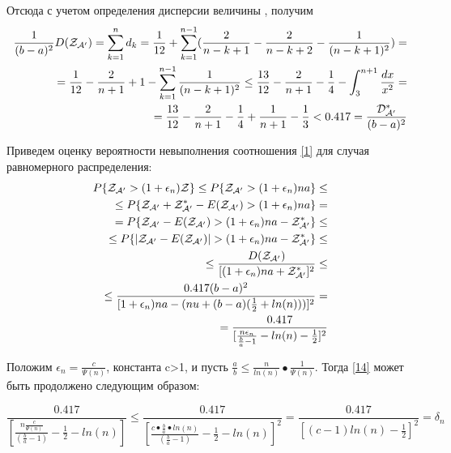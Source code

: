 \documentclass[a4paper, 14pt]{extarticle}
\numberwithin{equation}{section}
\begin{document}
Отсюда с учетом определения дисперсии величины \randomvalue , получим
\begin{equation}
\begin{aligned}
\frac{1}{(b-a)^2} \text{$D(\text{$\mathcal{Z_{A'}}$})$} = \sum_{k=1}^n d_k = \frac{1}{12} + \sum_{k=1}^{n-1} (\frac{2}{n-k+1} - \frac{2}{n-k+2} - \frac{1}{(n-k+1)^2}) = \\
= \frac{1}{12} - \frac{2}{n+1} +1 - \sum_{k=1}^{n-1} \frac{1}{(n-k+1)^2} \leq \frac{13}{12} - \frac{2}{n+1} - \frac{1}{4} - \int_3^{n+1} \frac{dx}{x^2} = \\
= \frac{13}{12} - \frac{2}{n+1} - \frac{1}{4} + \frac{1}{n+1} - \frac{1}{3} < 0.417 = \frac{\text{$\mathcal{D^*_{A'}}$}}{(b-a)^2} 
\end{aligned}
\end{equation}

Приведем оценку вероятности невыполнения соотношения \eqref{1} для случая равномерного распределения:
\begin{equation}\label{14}
\begin{aligned}
P\{ \text{$\mathcal{Z_{A'}}$} > (1+\epsilon_n) \mathcal{Z} \} \leq P\{ \text{$\mathcal{Z_{A'}}$} > (1+\epsilon_n)na \} \leq \\
\leq P\{ \text{$\mathcal{Z_{A'}}$} + \text{$\mathcal{Z^*_{A'}}$} - \text{$E(\text{$\mathcal{Z_{A'}}$})$} > (1+\epsilon_n)na \} = \\
= P \{ \text{$\mathcal{Z_{A'}}$} - \text{$E(\text{$\mathcal{Z_{A'}}$})$} > (1+\epsilon_n)na - \text{$\mathcal{Z^*_{A'}}$} \} \leq \\
\leq P \{ |\text{$\mathcal{Z_{A'}}$} - \text{$E(\text{$\mathcal{Z_{A'}}$})$}| > (1+\epsilon_n)na - \text{$\mathcal{Z^*_{A'}}$} \} \leq \\
\leq \frac{\text{$D(\text{$\mathcal{Z_{A'}}$})$}}{[(1+\epsilon_n)na + \text{$\mathcal{Z^*_{A'}}$}]^2} \leq \\
\leq \frac{0.417(b-a)^2}{[1+\epsilon_n)na-(nu+(b-a)(\frac{1}{2}+ln(n)))]^2} = \\
= \frac{0.417}{[\frac{n\epsilon_n}{\frac{b}{a}-1}-ln(n) -\frac{1}{2}]^2}
\end{aligned}
\end{equation}

Положим $\epsilon_n = \frac{c}{\Psi(n)}$, константа c>1, и пусть $\frac{a}{b} \leq \frac{n}{ln(n)} • \frac{1}{\Psi(n)}$. Тогда \eqref{14} может быть продолжено следующим образом:

\begin{equation}
\frac{0.417}{[\frac{n\frac{c}{\Psi(n)}}{(\frac{b}{a}-1)}-\frac{1}{2}-ln(n)]} \leq \frac{0.417}{[\frac{c•\frac{b}{a}•ln(n)}{(\frac{b}{a}-1)}-\frac{1}{2}-ln(n)]^2} = \frac{0.417}{[(c-1)ln(n)-\frac{1}{2}]^2} = \delta_n
\end{equation}
\end{document}
